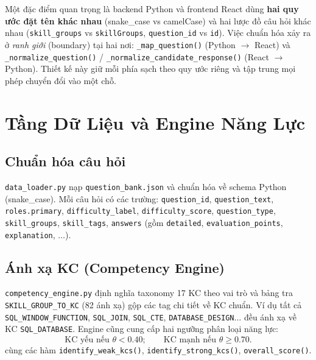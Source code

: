 \documentclass[12pt, a4paper]{report}
\begin{document}
Một đặc điểm quan trọng là backend Python và frontend React dùng \textbf{hai quy ước đặt tên khác nhau} (snake\_case vs camelCase) và hai lược đồ câu hỏi khác nhau (\texttt{skill\_groups} vs \texttt{skillGroups}, \texttt{question\_id} vs \texttt{id}). Việc chuẩn hóa xảy ra ở \textit{ranh giới} (boundary) tại hai nơi: \texttt{\_map\_question()} (Python $\to$ React) và \texttt{\_normalize\_question()} / \texttt{\_normalize\_candidate\_response()} (React $\to$ Python). Thiết kế này giữ mỗi phía sạch theo quy ước riêng và tập trung mọi phép chuyển đổi vào một chỗ.

\section{Tầng Dữ Liệu và Engine Năng Lực}
\label{sec:data_layer}

\subsection{Chuẩn hóa câu hỏi}
\texttt{data\_loader.py} nạp \texttt{question\_bank.json} và chuẩn hóa về schema Python (snake\_case). Mỗi câu hỏi có các trường: \texttt{question\_id}, \texttt{question\_text}, \texttt{roles.primary}, \texttt{difficulty\_label}, \texttt{difficulty\_score}, \texttt{question\_type}, \texttt{skill\_groups}, \texttt{skill\_tags}, \texttt{answers} (gồm \texttt{detailed}, \texttt{evaluation\_points}, \texttt{explanation}, $\ldots$).

\subsection{Ánh xạ KC (Competency Engine)}
\texttt{competency\_engine.py} định nghĩa taxonomy 17 KC theo vai trò và bảng tra \texttt{SKILL\_GROUP\_TO\_KC} (82 ánh xạ) gộp các tag chi tiết về KC chuẩn. Ví dụ tất cả \texttt{SQL\_WINDOW\_FUNCTION}, \texttt{SQL\_JOIN}, \texttt{SQL\_CTE}, \texttt{DATABASE\_DESIGN}$\ldots$ đều ánh xạ về KC \texttt{SQL\_DATABASE}. Engine cũng cung cấp hai ngưỡng phân loại năng lực:
\begin{equation}
  \text{KC yếu nếu } \theta < 0.40; \qquad \text{KC mạnh nếu } \theta \geq 0.70 .
\end{equation}
cùng các hàm \texttt{identify\_weak\_kcs()}, \texttt{identify\_strong\_kcs()}, \texttt{overall\_score()}.

\end{document}
